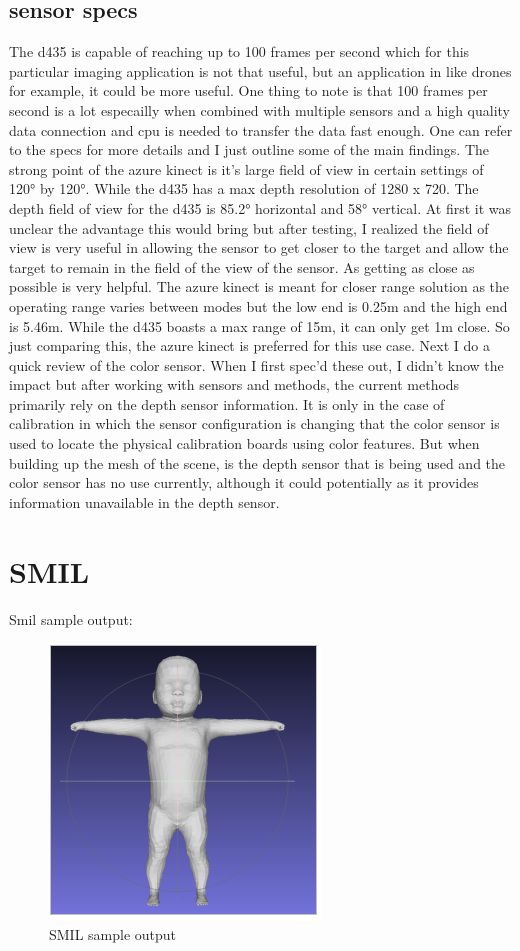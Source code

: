 \subsection{sensor specs}
The d435 is capable of reaching up to 100 frames per second which for this particular imaging application is not that useful, but an application in like drones for example, it could be more useful. One thing to note is that 100 frames per second is a lot especailly when combined with multiple sensors and a high quality data connection and cpu is needed to transfer the data fast enough. One can refer to the specs for more details and I just outline some of the main findings. The strong point of the azure kinect is it's large field of view in certain settings of \ang{120} by \ang{120}. While the d435 has a max depth resolution of 1280 x 720. The depth field of view for the d435 is \ang{85.2} horizontal and \ang{58} vertical. At first it was unclear the advantage this would bring but after testing, I realized the field of view is very useful in allowing the sensor to get closer to the target and allow the target to remain in the field of the view of the sensor. As getting as close as possible is very helpful. The azure kinect is meant for closer range solution as the operating range varies between modes but the low end is 0.25m and the high end is 5.46m. While the d435 boasts a max range of 15m, it can only get 1m close. So just comparing this, the azure kinect is preferred for this use case. Next I do a quick review of the color sensor. When I first spec'd these out, I didn't know the impact but after working with sensors and methods, the current methods primarily rely on the depth sensor information. It is only in the case of calibration in which the sensor configuration is changing that the color sensor is used to locate the physical calibration boards using color features. But when building up the mesh of the scene, is the depth sensor that is being used and the color sensor has no use currently, although it could potentially as it provides information unavailable in the depth sensor.
\section{SMIL}
Smil sample output:
\begin{figure}[h]
	\caption{SMIL sample output}
	\centering
	\includegraphics[]{images/smil.png}
\end{figure}


